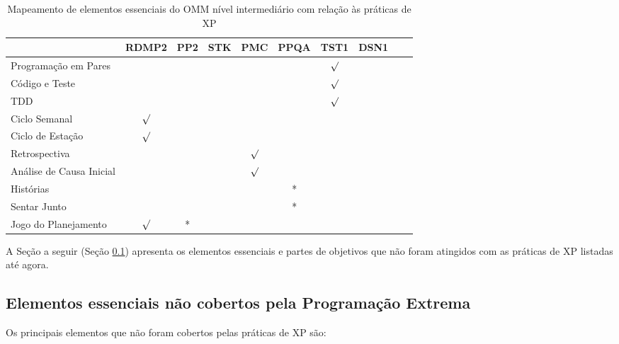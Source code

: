 \begin{table}
  \centering
  \begin{tabular}{|p{6cm}|c|c|c|c|c|c|c|c|c|}
    \hline
    & RDMP2 & PP2 & STK & PMC & PPQA & TST1 & DSN1\\
    \hline
    Programação em Pares & & & & & & $\surd$ & \\
    \hline
    Código e Teste & & & & & & $\surd$ & \\
    \hline
    TDD & & & & & & $\surd$ & \\
    \hline
    Ciclo Semanal & $\surd$ & & & & & & \\
    \hline
    Ciclo de Estação & $\surd$ & & & & & & \\
    \hline
    Retrospectiva & & & & $\surd$ & & & \\
    \hline
    Análise de Causa Inicial & & & & $\surd$ & & & \\
    \hline
    Histórias & & & & & * & & \\
    \hline
    Sentar Junto & & & & & * & & \\
    \hline
    Jogo do Planejamento & $\surd$ & * & & & & & \\
    \hline
  \end{tabular}
  \caption{Mapeamento de elementos essenciais do OMM nível
    intermediário com relação às práticas de XP}
  \label{tab:omm-intermediary-by-xp}
\end{table}

A Seção a seguir (Seção \ref{sec:xp-omm}) apresenta os elementos
essenciais e partes de objetivos que não foram atingidos com as
práticas de XP listadas até agora.

\subsection{Elementos essenciais não cobertos pela Programação
  Extrema}
\label{sec:xp-omm}

Os principais elementos que não foram cobertos pelas práticas de XP
são:


